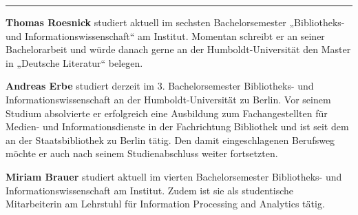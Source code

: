 \begin{center}\rule{0.5\linewidth}{\linethickness}\end{center}

\textbf{Thomas Roesnick} studiert aktuell im sechsten Bachelorsemester
„Bibliotheks- und Informationswissenschaft`` am Institut. Momentan
schreibt er an seiner Bachelorarbeit und würde danach gerne an der
Humboldt-Universität den Master in „Deutsche Literatur`` belegen.

\textbf{Andreas Erbe} studiert derzeit im 3. Bachelorsemester
Bibliotheks- und Informationswissenschaft an der Humboldt-Universität zu
Berlin. Vor seinem Studium absolvierte er erfolgreich eine Ausbildung
zum Fachangestellten für Medien- und Informationsdienste in der
Fachrichtung Bibliothek und ist seit dem an der Staatsbibliothek zu
Berlin tätig. Den damit eingeschlagenen Berufsweg möchte er auch nach
seinem Studienabschluss weiter fortsetzten.

\textbf{Miriam Brauer} studiert aktuell im vierten Bachelorsemester
Bibliotheks- und Informationswissenschaft am Institut. Zudem ist sie als
studentische Mitarbeiterin am Lehrstuhl für Information Processing and
Analytics tätig.
